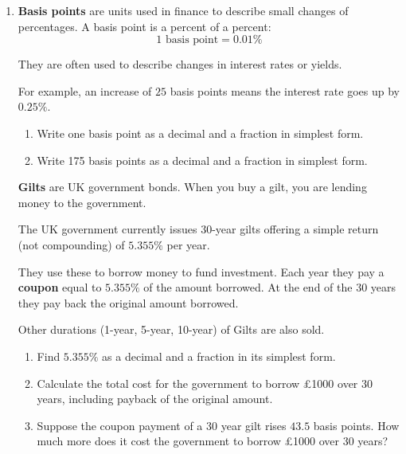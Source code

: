 \documentclass[12pt]{article}
\begin{document}
\begin{enumerate}[label=\textbf{Q\arabic*.}, start=4]

\item

\textbf{Basis points} are units used in finance to describe small changes of percentages. A basis point is a percent of a percent:  
\[
1 \text{ basis point} = 0.01\%
\]

They are often used to describe changes in interest rates or yields.

For example, an increase of \( 25 \) basis points means the interest rate goes up by \( 0.25\% \).

\medskip





\begin{enumerate}[label=(\alph*)]
    \item Write one basis point as a decimal and a fraction in simplest form.
    \item Write 175 basis points as a decimal and a fraction in simplest form.
\end{enumerate}

\bigskip
    \textbf{Gilts} are UK government bonds. When you buy a gilt, you are lending money to the government.  

    The UK government currently issues 30-year gilts offering a simple return (not compounding) of $5.355\%$ per year. 

    They use these to borrow money to fund investment. Each year they pay a \textbf{coupon} equal to $5.355\%$ of the amount borrowed. At the end of the 30 years they pay back the original amount borrowed. 
    
    Other durations (1-year, 5-year, 10-year) of Gilts are also sold.

\medskip

\begin{enumerate}[label=(\alph*), resume]
    \item Find $5.355\%$ as a decimal and a fraction in its simplest form.
    \item Calculate the total cost for the government to borrow £1000 over 30 years, including payback of the original amount.
    \item Suppose the coupon payment of a 30 year gilt rises \( 43.5 \) basis points. How much more does it cost the government to borrow £1000 over 30 years?
\end{enumerate}

\end{enumerate}
\end{document}

